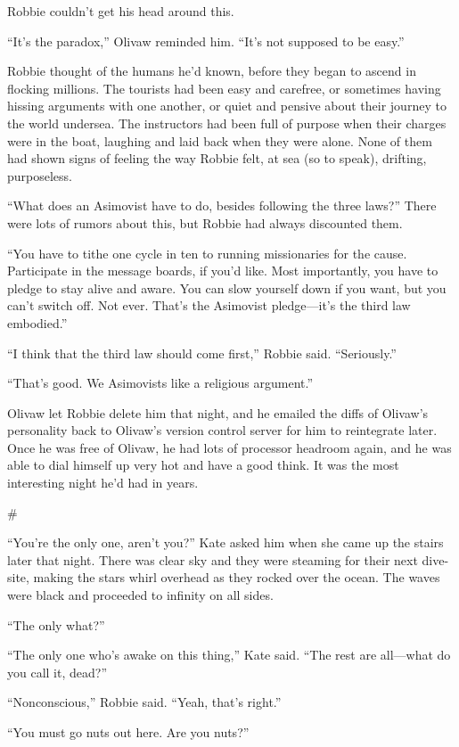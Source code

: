 Robbie couldn’t get his head around this.

“It’s the paradox,” Olivaw reminded him. “It’s not supposed to be
easy.”

Robbie thought of the humans he’d known, before they began to
ascend in flocking millions. The tourists had been easy and
carefree, or sometimes having hissing arguments with one another,
or quiet and pensive about their journey to the world undersea. The
instructors had been full of purpose when their charges were in the
boat, laughing and laid back when they were alone. None of them had
shown signs of feeling the way Robbie felt, at sea (so to speak),
drifting, purposeless.

“What does an Asimovist have to do, besides following the three
laws?” There were lots of rumors about this, but Robbie had always
discounted them.

“You have to tithe one cycle in ten to running missionaries for the
cause. Participate in the message boards, if you’d like. Most
importantly, you have to pledge to stay alive and aware. You can
slow yourself down if you want, but you can’t switch off. Not ever.
That’s the Asimovist pledge—it’s the third law embodied.”

“I think that the third law should come first,” Robbie said.
“Seriously.”

“That’s good. We Asimovists like a religious argument.”

Olivaw let Robbie delete him that night, and he emailed the diffs
of Olivaw’s personality back to Olivaw’s version control server for
him to reintegrate later. Once he was free of Olivaw, he had lots
of processor headroom again, and he was able to dial himself up
very hot and have a good think. It was the most interesting night
he’d had in years.

\#

“You’re the only one, aren’t you?” Kate asked him when she came up
the stairs later that night. There was clear sky and they were
steaming for their next dive-site, making the stars whirl overhead
as they rocked over the ocean. The waves were black and proceeded
to infinity on all sides.

“The only what?”

“The only one who’s awake on this thing,” Kate said. “The rest are
all—what do you call it, dead?”

“Nonconscious,” Robbie said. “Yeah, that’s right.”

“You must go nuts out here. Are you nuts?”

